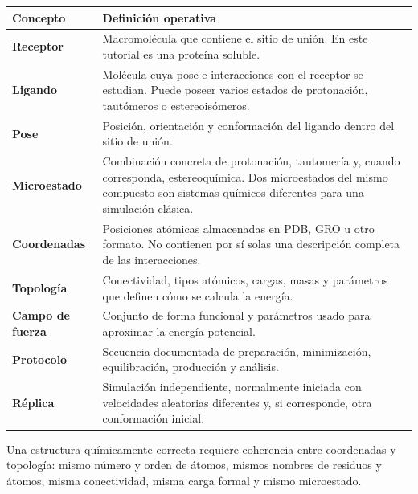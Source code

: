 \documentclass[
  spanish,
  11pt,
  a4paper]{article}
\newcounter{none} %
\begin{document}
{\def\LTcaptype{none} %
\begin{longtable}[]{@{}
  >{\raggedright\arraybackslash}p{}
  >{\raggedright\arraybackslash}p{}@{}}
\toprule\noalign{}
\begin{minipage}[b]{\linewidth}\raggedright
Concepto
\end{minipage} & \begin{minipage}[b]{\linewidth}\raggedright
Definición operativa
\end{minipage} \\
\midrule\noalign{}
\endhead
\bottomrule\noalign{}
\endlastfoot
\textbf{Receptor} & Macromolécula que contiene el sitio de unión. En
este tutorial es una proteína soluble. \\
\textbf{Ligando} & Molécula cuya pose e interacciones con el receptor se
estudian. Puede poseer varios estados de protonación, tautómeros o
estereoisómeros. \\
\textbf{Pose} & Posición, orientación y conformación del ligando dentro
del sitio de unión. \\
\textbf{Microestado} & Combinación concreta de protonación, tautomería
y, cuando corresponda, estereoquímica. Dos microestados del mismo
compuesto son sistemas químicos diferentes para una simulación
clásica. \\
\textbf{Coordenadas} & Posiciones atómicas almacenadas en PDB, GRO u
otro formato. No contienen por sí solas una descripción completa de las
interacciones. \\
\textbf{Topología} & Conectividad, tipos atómicos, cargas, masas y
parámetros que definen cómo se calcula la energía. \\
\textbf{Campo de fuerza} & Conjunto de forma funcional y parámetros
usado para aproximar la energía potencial. \\
\textbf{Protocolo} & Secuencia documentada de preparación, minimización,
equilibración, producción y análisis. \\
\textbf{Réplica} & Simulación independiente, normalmente iniciada con
velocidades aleatorias diferentes y, si corresponde, otra conformación
inicial. \\
\end{longtable}
}

Una estructura químicamente correcta requiere coherencia entre
coordenadas y topología: mismo número y orden de átomos, mismos nombres
de residuos y átomos, misma conectividad, misma carga formal y mismo
microestado.
\end{document}

